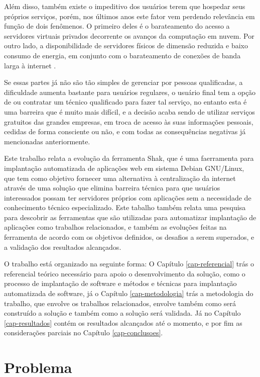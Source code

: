 Além disso, também existe o impeditivo dos usuários terem que hospedar seus próprios serviços,
porém, nos últimos anos este fator vem perdendo relevância em função de
dois fenômenos. O primeiro deles é o barateamento do acesso a servidores virtuais
privados decorrente os avanços da computação em nuvem. Por outro lado, a
disponibilidade de servidores físicos de dimensão reduzida e baixo consumo de
energia, em conjunto com o barateamento de conexões de banda larga à internet \cite{shak2015}.

Se essas partes já não são tão simples de gerenciar por pessoas qualificadas, a dificuldade
aumenta bastante para usuários regulares, o usuário final tem a opção de ou contratar
um técnico qualificado para fazer tal serviço, no entanto esta é uma barreira
que é muito mais difícil, e a decisão acaba sendo de utilizar
serviços gratuitos das grandes empresas, em troca de acesso às suas informações pessoais,
cedidas de forma consciente ou não, e com todas as consequências negativas já
mencionadas anteriormente.

Este trabalho relata a evolução da ferramenta Shak, que é uma faerramenta para implantação
automatizada de aplicações web em sistema Debian GNU/Linux, que tem como objetivo fornecer
uma alternativa à centralização da internet através de uma solução que elimina
barreira técnica para que usuários interessados possam ter servidores próprios
com aplicações sem a necessidade de conhecimento
técnico especializado. Este tabalho também relata uma pesquisa para
descobrir as ferramentas que são utilizadas para automatizar implantação de aplicações
como trabalhos relacionados, e também as evoluções feitas na ferramenta de acordo
com os objetivos definidos, os desafios a serem superados, e a validação dos
resultados alcançados.

O trabalho está organizado na seguinte forma:  O Capítulo \ref{cap-referencial}
trás o referencial teórico necessário para apoio o desenvolvimento da solução,
como o processo de implantação de software e métodos e técnicas para implantação
automatizada de software, já o Capítulo \ref{cap-metodologia}
trás a metodologia do trabalho, que envolve os trabalhos relacionados, envolve também
como será construído a solução e também como a solução será validada. Já no Capítulo
\ref{cap-resultados} contém os resultados alcançados até o momento, e por fim as
considerações parciais no Capítulo \ref{cap-conclusoes}.

\section{Problema}


